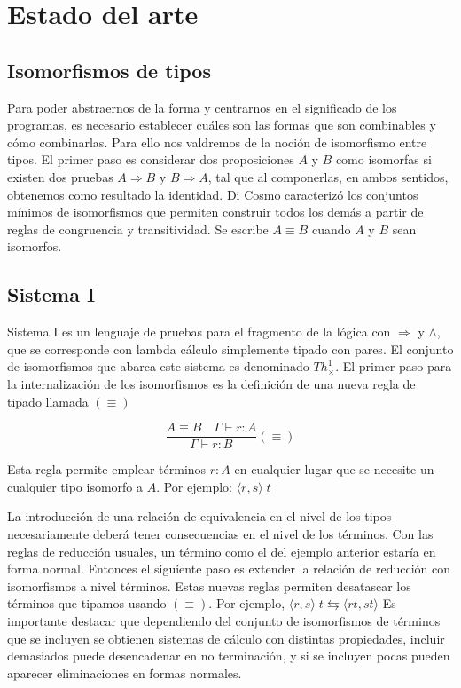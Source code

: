 \documentclass[]{report}
\begin{document}
	\section{Estado del arte}
	\subsection{Isomorfismos de tipos}
	
	Para poder abstraernos de la forma y centrarnos en el significado de los programas, es necesario establecer cuáles son las formas que son combinables y cómo combinarlas.
	Para ello nos valdremos de la noción de isomorfismo entre tipos.
	El primer paso es considerar dos proposiciones $A$ y $B$ como isomorfas si existen dos pruebas $A \Rightarrow B$ y $B \Rightarrow A$, tal que al componerlas, en ambos sentidos, obtenemos como resultado la identidad.
	Di Cosmo \cite{MSCSSurvey05} caracterizó los conjuntos mínimos de isomorfismos que permiten construir todos los demás a partir de reglas de congruencia y transitividad.
	Se escribe $A \equiv B$ cuando $A$ y $B$ sean isomorfos.
	
	
	\subsection{Sistema I}
	Sistema I \cite{system-i} es un lenguaje de pruebas para el fragmento de la lógica con $\Rightarrow$ y $\wedge$, que se corresponde con lambda cálculo simplemente tipado con pares.
	El conjunto de isomorfismos que abarca este sistema es denominado $Th^1_\times$.
	El primer paso para la internalización de los isomorfismos es la definición de una nueva regla de tipado llamada $(\equiv)$
	
	\[ \frac{A \equiv B \quad \Gamma \vdash r:A}{\Gamma \vdash r:B} (\equiv) \]
	
	Esta regla permite emplear términos $r:A$ en cualquier lugar que se necesite un cualquier tipo isomorfo a $A$. Por ejemplo:
	$\langle r, s \rangle \; t$
	
	La introducción de una relación de equivalencia en el nivel de los tipos necesariamente deberá tener consecuencias en el nivel de los términos.
	Con las reglas de reducción usuales, un término como el del ejemplo anterior estaría en forma normal.
	Entonces el siguiente paso es extender la relación de reducción con	isomorfismos a nivel términos.
	Estas nuevas reglas permiten desatascar los términos que tipamos usando $(\equiv)$.
	Por ejemplo, $\langle r, s \rangle \; t \leftrightarrows \langle r t, s t \rangle$
	Es importante destacar que dependiendo del conjunto de isomorfismos de términos que se incluyen se obtienen sistemas de cálculo con distintas propiedades, incluir demasiados puede desencadenar en no terminación, y si se incluyen pocas pueden aparecer eliminaciones en formas normales.
	
\end{document}

